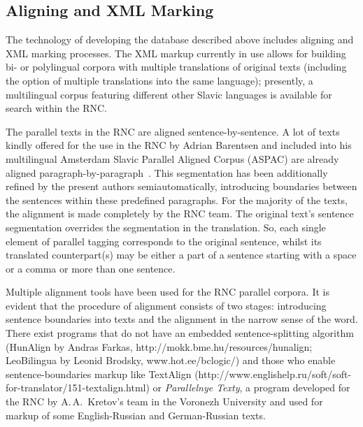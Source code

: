 \begin{multicols}{2}
\section{Aligning and XML Marking}

\noindent
The technology of developing the database described above includes aligning and XML marking 
processes. The XML markup currently in use allows for building bi- or polylingual corpora with 
multiple translations of original texts (including the option of multiple translations into the same 
language); presently, a multilingual corpus featuring different other Slavic languages is available for 
search within the RNC.

   The parallel texts in the RNC are aligned sentence-by-sentence. 
   A lot of texts kindly offered for 
the use in the RNC by Adrian Barentsen and included into his  multilingual Amsterdam
Slavic Parallel Aligned Corpus (\mbox{ASPAC}) are 
already aligned paragraph-by-paragraph~\cite{33-zat}. This segmentation has been additionally 
refined by the present authors semiautomatically, introducing boundaries between the sentences 
within these predefined paragraphs. For the majority of the texts,
the alignment is made completely by the RNC 
team. The original text's sentence segmentation overrides the segmentation in the translation. So, 
each single element of parallel tagging corresponds to the original sentence, whilst its translated 
counterpart(s) may be either a part of a sentence starting with a space or a comma or more than 
one sentence. 
   
   Multiple alignment tools have been used for the RNC parallel corpora. It is evident that the 
procedure of alignment consists of two stages: introducing sentence boundaries into texts and the 
alignment in the narrow sense of the word. There exist programs that do not have an embedded 
sentence-splitting algorithm (HunAlign by Andras Farkas, {\sf 
http://mokk.bme.hu/resources/hunalign}; LeoBilingua by Leonid Brodsky, {\sf 
www.hot.ee/bclogic/}) and those who enable sentence-boundaries markup like TextAlign 
(http://www.englishelp.ru/soft/soft-for-translator/151-textalign.html) or \textit{Parallelnye Texty}, a 
program developed for the RNC by A.\,A.~Kretov's team in the Voronezh University and used for 
markup of some English-Russian and German-Russian texts.
   

\end{multicols}
